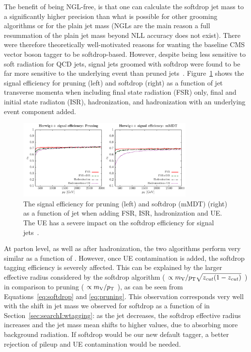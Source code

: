 The benefit of being NGL-free, is that one can calculate the softdrop jet mass to a significantly higher precision than what is possible for other grooming algorithms or for the plain jet mass (NGLs are the main reason a full resummation of the plain jet mass beyond NLL accuracy does not exist). There were therefore theoretically well-motivated reasons for wanting the baseline CMS vector boson tagger to be softdrop-based. However, despite being less sensitive to soft radiation for QCD jets, signal jets groomed with softdrop were found to be far more sensitive to the underlying event than pruned jets~\cite{Dasgupta:2015yua}. Figure~\ref{fig:searchII:ue} shows the signal efficiency for pruning (left) and softdrop (right) as a function of jet transverse momenta when including final state radiation (FSR) only, final and initial state radiaton (ISR), hadronization, and hadronization with an underlying event component added.
\begin{figure}[h!]
\centering
\includegraphics[width=0.79\textwidth]{figures/analysis/search2/misc/pruningvssd_ue.pdf}
\caption{The signal efficiency for pruning (left) and softdrop (mMDT) (right) as a function of jet \PT when adding FSR, ISR, hadronization and UE. The UE has a severe impact on the softdrop efficiency for signal jets~\cite{Dasgupta:2015yua}. }
\label{fig:searchII:ue}
\end{figure}
At parton level, as well as after hadronization, the two algorithms perform very similar as a function of \PT. However, once UE contamination is added, the softdrop tagging efficiency is severely affected. This can be explained by the larger effective radius considered by the softdrop algorithm ( $\propto m_{\mathrm{V}}/p_{\mathrm{T}} \sqrt{z_{cut}(1-z_{cut})}$ ) in comparison to pruning ( $\propto m_{\mathrm{V}}/p_{\mathrm{T}}$ ), as can be seen from Equations~\ref{eq:softdrop} and \ref{eq:pruning}. This observation corresponds very well with the shift in jet mass we observed for softdrop as a function of \PT in Section~\ref{sec:searchI:wtagging}: as the jet \PT decreases, the softdrop effective radius increases and the jet mass mean shifts to higher values, due to absorbing more background radiation. If softdrop would be our new default tagger, a better rejection of pileup and UE contamination would be needed.\par
